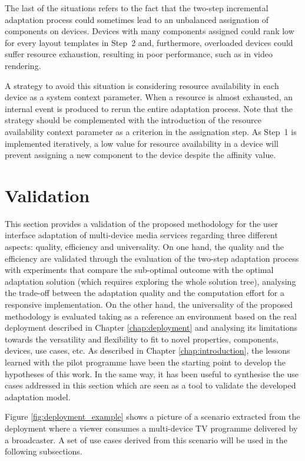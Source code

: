 The last of the situations refers to the fact that the two-step incremental adaptation process could sometimes lead to an unbalanced assignation of components on devices.
Devices with many components assigned could rank low for every layout templates in Step~2 and, furthermore, overloaded devices could suffer resource exhaustion, resulting in poor performance, such as in video rendering. 

A strategy to avoid this situation is considering resource availability in each device as a system context parameter. 
When a resource is almost exhausted, an internal event is produced to rerun the entire adaptation process. 
Note that the strategy should be complemented with the introduction of the resource availability context parameter as a criterion in the assignation step. 
As Step~1 is implemented iteratively, a low value for resource availability in a device will prevent assigning a new component to the device despite the affinity value.



\section{Validation}\label{val}

This section provides a validation of the proposed methodology for the user interface adaptation of multi-device media services regarding three different aspects: quality, efficiency and universality. On one hand, the quality and the efficiency are validated through the evaluation of the two-step adaptation process with experiments that compare the sub-optimal outcome with the optimal adaptation solution (which requires exploring the whole solution tree), analysing the trade-off between the adaptation quality and the computation effort for a responsive implementation. 
On the other hand, the universality of the proposed methodology is evaluated taking as a reference an environment based on the real deployment described in Chapter \ref{chap:deployment} and analysing its limitations towards the versatility and flexibility to fit to novel properties, components, devices, use cases, etc. As described in Chapter \ref{chap:introduction}, the lessons learned with the pilot programme have been the starting point to develop the hypotheses of this work. In the same way, it has been useful to synthesise the use cases addressed in this section which are seen as a tool to validate the developed adaptation model.

Figure \ref{fig:deployment_example} shows a picture of a scenario extracted from the deployment where a viewer consumes a multi-device TV programme delivered by a broadcaster. A set of use cases derived from this scenario will be used in the following subsections.

